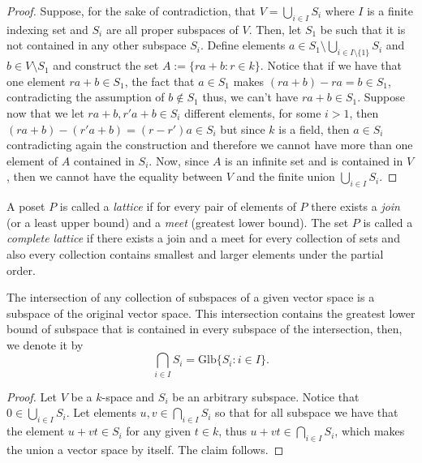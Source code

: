 \begin{proof}
   Suppose, for the sake of contradiction, that \(V = \bigcup_{i \in  I} S_i\)
   where \(I\) is a finite indexing set and \(S_i\) are all proper subspaces of
   \(V\). Then, let \(S_1\) be such that it is not contained in any other
   subspace \(S_i\). Define elements \(a \in S_1 \setminus \bigcup_{i \in
   I \setminus \{1\} } S_i \) and \(b \in V \setminus S_1\) and construct the
   set \(A := \{ra + b : r \in k\}\). Notice that if we have that one element
   \(ra + b \in S_1\), the fact that \(a \in S_1\) makes \((ra + b) - ra = b
   \in S_1\), contradicting the assumption of \(b \not\in S_1\) thus, we can't
   have \(ra + b \in S_1\). Suppose now that we let \(ra + b, r'a + b \in S_i\)
   different elements, for some \(i > 1\), then \((ra + b) - (r'a + b) = (r -
   r')a \in S_i\) but since \(k\) is a field, then \(a \in S_i\) contradicting
   again the construction and therefore we cannot have more than one element of
   \(A\) contained in \(S_i\). Now, since \(A\) is an infinite set and is
   contained in \(V\), then we cannot have the equality between \(V\) and the
   finite union \(\bigcup_{i \in  I} S_i\).
\end{proof}

\begin{definition}[Lattice]\label{def: lattice}
   A poset \(P\) is called a \emph{lattice} if for every pair of
   elements of \(P\) there exists a \emph{join} (or a least upper bound) and a
   \emph{meet} (greatest lower bound). The set \(P\) is called a \emph{complete
   lattice} if there exists a join and a meet for every collection of sets and
   also every collection contains smallest and larger elements under the partial
   order.
\end{definition}

\begin{proposition}\label{prop: intersection of subspaces}
   The intersection of any collection of subspaces of a given vector space is a
   subspace of the original vector space. This intersection contains the
   greatest lower bound of subspace that is contained in every subspace of the
   intersection, then, we denote it by
   \[
      \bigcap_{i \in  I} S_i = \mathrm{Glb}\{S_i : i \in I\}.
   \]
\end{proposition}

\begin{proof}
   Let \(V\) be a \(k\)-space and \(S_i\) be an arbitrary subspace. Notice that
   \(0 \in \bigcup_{i \in  I} S_i\). Let elements \(u, v \in \bigcap_{i \in  I}
   S_i\) so that for all subspace we have that the element \(u + vt \in S_i\)
   for any given \(t \in k\), thus \(u + vt \in \bigcap_{i \in  I} S_i\), which
   makes the union a vector space by itself. The claim follows.
\end{proof}

